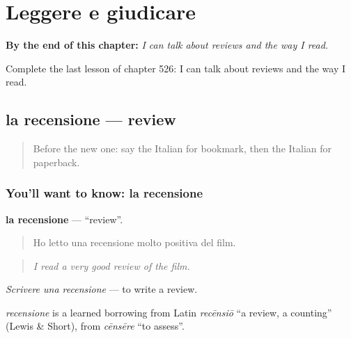 
\chapter{Leggere e giudicare}
\label{ch:it-leggere-e-giudicare}

\begin{chapteropening}
\textbf{By the end of this chapter:} \emph{I can talk about reviews and the way I read.}

Complete the last lesson of chapter 526: I can talk about reviews and the way I read.
\end{chapteropening}

\section[la recensione]{la recensione — review}

\label{lesson:IT-C526-recensione}



\begin{quote}
Before the new one: say the Italian for bookmark, then the Italian for paperback.
\end{quote}

\subsection*{You'll want to know: la recensione}
\textbf{la recensione} — \textquotedblleft{}review\textquotedblright{}.

\begin{quote}
Ho letto una recensione molto positiva del film.
\end{quote}

\begin{quote}
\emph{I read a very good review of the film.}
\end{quote}

\emph{Scrivere una recensione} — to write a review.

\begin{cousinweb}
\emph{recensione} is a learned borrowing from Latin \emph{recēnsiō} \textquotedblleft{}a review, a counting\textquotedblright{} (Lewis \& Short), from \emph{cēnsēre} \textquotedblleft{}to assess\textquotedblright{}.
\end{cousinweb}

